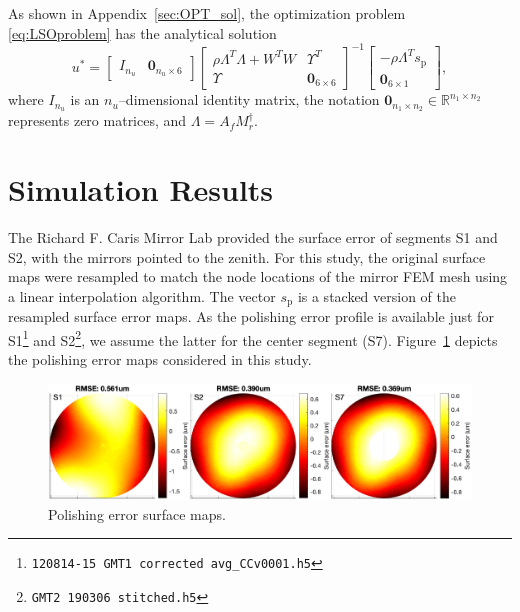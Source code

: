 \documentclass{gmto}
\begin{document}
As shown in Appendix~\ref{sec:OPT_sol}, the optimization problem \eqref{eq:LSOproblem} has the analytical solution
\begin{equation}
\label{eq:LSOsol}
u^\ast = 
\begin{bmatrix}
I_{n_u} & \mathbf{0}_{n_u \times 6}
\end{bmatrix}
\begin{bmatrix}
\rho \Lambda^T\Lambda + W^TW & \Upsilon^T \\ \Upsilon & \mathbf{0}_{6 \times 6}
\end{bmatrix}^{-1} \begin{bmatrix}
- \rho \Lambda^T s_{\text{p}} \\ \mathbf{0}_{6 \times 1}
\end{bmatrix},
\end{equation}
where $I_{n_u}$ is an $n_u$--dimensional identity matrix, the notation $\mathbf{0}_{n_1 \times n_2} \in \mathbb{R}^{n_1 \times n_2}$ represents zero matrices, and $\Lambda = A_f M_r^\dagger$.


\section{Simulation Results}
\label{sec:simulations}

The Richard F. Caris Mirror Lab provided the surface error of segments \textsf{S1} and \textsf{S2}, with the mirrors pointed to the zenith. For this study, the original surface maps were resampled to match the node locations of the mirror FEM mesh using a linear interpolation algorithm. The vector $s_{\text{p}}$ is a stacked version of the resampled surface error maps. As the polishing error profile is available just for \textsf{S1}\footnote{\texttt{120814-15 GMT1 corrected avg\_CCv0001.h5}} and \textsf{S2}\footnote{\texttt{GMT2 190306 stitched.h5}}, we assume the latter for the center segment (\textsf{S7}). Figure~\ref{fig:pol_error_maps} depicts the polishing error maps considered in this study.
%
\begin{figure}[!hbt]
    \vspace{6pt}
    \centering
    \includegraphics[width=\textwidth]{./pictures/polishing_errorS127.eps}
    \caption{Polishing error surface maps.}
    \label{fig:pol_error_maps}
\end{figure}
\end{document}
